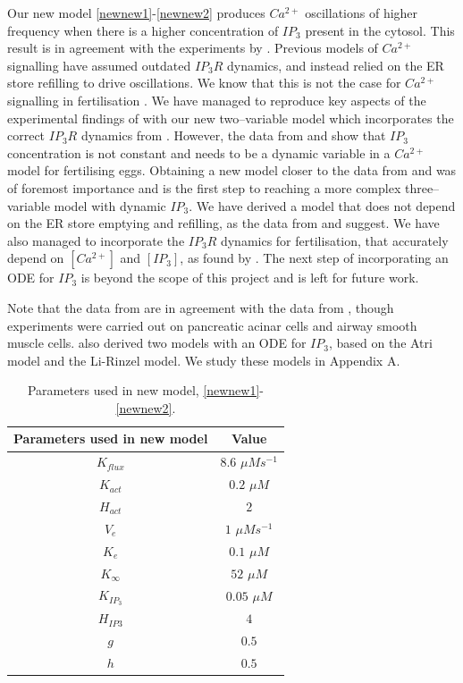 Our new model \eqref{newnew1}-\eqref{newnew2} produces $Ca^{2+}$ oscillations of higher frequency when there is a higher concentration of $IP_3$ present in the cytosol. This result is in agreement with the experiments by . Previous models of $Ca^{2+}$ signalling  \cite{atri,lirinzel,deyoungkeizer,Sanders2018,Theodoridou2013} have assumed outdated $IP_3R$ dynamics, and instead relied on the ER store refilling to drive oscillations. We know that this is not the case for $Ca^{2+}$ signalling in fertilisation \cite{Sanders2018, wakai}. We have managed to reproduce key aspects of the experimental findings of  with our new two--variable model which incorporates the correct $IP_3R$ dynamics from . However, the data from  and  show that $IP_3$ concentration is not constant and needs to be a dynamic variable in a $Ca^{2+}$ model for fertilising eggs. Obtaining a new model closer to the data from  and  was of foremost importance and is the first step to reaching a more complex three--variable model with dynamic $IP_3$. {We have derived a model that does not depend on the ER store emptying and refilling, as the data from  and  suggest. We have also managed to incorporate the $IP_3R$ dynamics for fertilisation, that accurately depend on $[Ca^{2+}]$ and $[IP_3]$, as found by .} The next step of incorporating an ODE for $IP_3$ is beyond the scope of this project and is left for future work.

Note that the data from  are in agreement with the data from , though experiments were carried out on pancreatic acinar cells and airway smooth muscle cells.  also derived two models with an ODE for $IP_3$, based on the Atri model and the Li-Rinzel model. We study these models in Appendix A.

\begin{table}[h!!!t!!!b!!!p]
\begin{center}
\begin{tabular}{ c c }
Parameters used in new model & Value\\
\hline
$K_{flux}$ & $8.6$ {$\mu M s^{-1}$}\\
\hline
$K_{act}$ & $0.2$ {$\mu M$}\\
\hline
$H_{act}$ & $2$\\
\hline
$V_e$ & $1$ {$\mu M s^{-1}$}\\
\hline
$K_e$ & $0.1$ {$\mu M$}\\
\hline
$K_{\infty}$ & $52$ {$\mu M$}\\
\hline
$K_{IP_3}$ & $0.05$ {$\mu M$}\\
\hline
$H_{IP3}$ & $4$\\
\hline
$g$ & $0.5$\\
\hline
$h$ & $0.5$
\end{tabular}
\end{center}
\caption{Parameters used in new model, \eqref{newnew1}-\eqref{newnew2}. }\label{tablewithhofersquared}
\end{table}